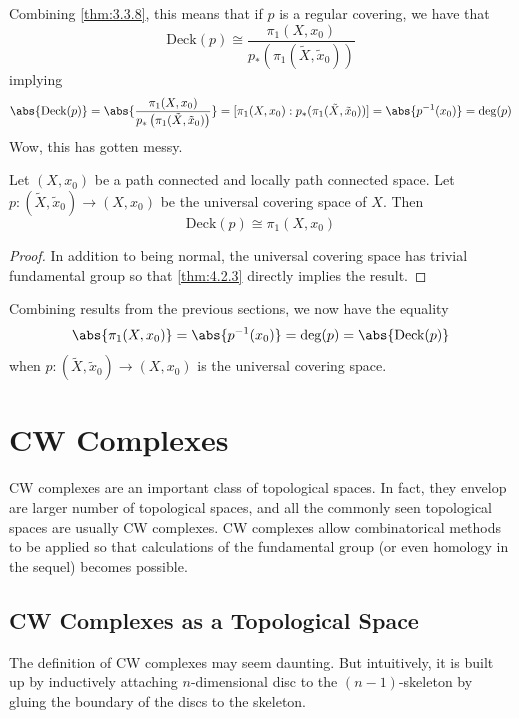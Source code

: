 \documentclass[a4paper]{article}
\begin{document}
Combining \ref{thm:3.3.8}, this means that if $p$ is a regular covering, we have that $$\text{Deck}(p)\cong\frac{\pi_1(X,x_0)}{p_\ast\left(\pi_1(\tilde{X},\tilde{x}_0)\right)}$$ implying $$\abs{\text{Deck}(p)}=\abs{\frac{\pi_1(X,x_0)}{p_\ast\left(\pi_1(\tilde{X},\tilde{x}_0)\right)}}=[\pi_1(X,x_0):p_\ast(\pi_1(\tilde{X},\tilde{x}_0))]=\abs{p^{-1}(x_0)}=\deg(p)$$ Wow, this has gotten messy. 

\begin{crl}{}{} Let $(X,x_0)$ be a path connected and locally path connected space. Let $p:(\tilde{X},\tilde{x}_0)\to(X,x_0)$ be the universal covering space of $X$. Then $$\text{Deck}(p)\cong\pi_1(X,x_0)$$ \tcbline
\begin{proof}
In addition to being normal, the universal covering space has trivial fundamental group so that \ref{thm:4.2.3} directly implies the result. 
\end{proof}
\end{crl}

Combining results from the previous sections, we now have the equality $$\abs{\pi_1(X,x_0)}=\abs{p^{-1}(x_0)}=\deg(p)=\abs{\text{Deck}(p)}$$ when $p:(\tilde{X},\tilde{x}_0)\to(X,x_0)$ is the universal covering space. 

\pagebreak
\section{CW Complexes}
CW complexes are an important class of topological spaces. In fact, they envelop are larger number of topological spaces, and all the commonly seen topological spaces are usually CW complexes. CW complexes allow combinatorical methods to be applied so that calculations of the fundamental group (or even homology in the sequel) becomes possible. 

\subsection{CW Complexes as a Topological Space}
The definition of CW complexes may seem daunting. But intuitively, it is built up by inductively attaching $n$-dimensional disc to the $(n-1)$-skeleton by gluing the boundary of the discs to the skeleton. 
\end{document}
